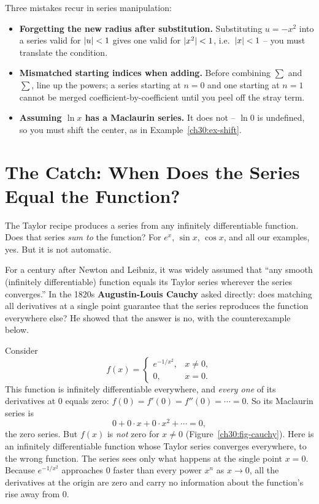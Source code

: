 \begin{trapbox}
Three mistakes recur in series manipulation:
\begin{itemize}
  \item \textbf{Forgetting the new radius after substitution.} Substituting $u=-x^2$ into a series valid for $\lvert u\rvert<1$ gives one valid for $\lvert x^2\rvert<1$, i.e.\ $\lvert x\rvert<1$ -- you must translate the condition.
  \item \textbf{Mismatched starting indices when adding.} Before combining $\sum$ and $\sum$, line up the powers; a series starting at $n=0$ and one starting at $n=1$ cannot be merged coefficient-by-coefficient until you peel off the stray term.
  \item \textbf{Assuming $\ln x$ has a Maclaurin series.} It does not -- $\ln 0$ is undefined, so you must shift the center, as in Example~\ref{ch30:ex-shift}.
\end{itemize}
\end{trapbox}

\section{The Catch: When Does the Series Equal the Function?}
\label{ch30:sec-catch}

The Taylor recipe produces a series from any infinitely differentiable function. Does that series \emph{sum to} the function? For $e^x$, $\sin x$, $\cos x$, and all our examples, yes. But it is not automatic.

For a century after Newton and Leibniz, it was widely assumed that ``any smooth (infinitely differentiable) function equals its Taylor series wherever the series converges.'' In the 1820s \textbf{Augustin-Louis Cauchy} asked directly: does matching all derivatives at a single point guarantee that the series reproduces the function everywhere else? He showed that the answer is no, with the counterexample below.

\begin{trapbox}
Consider
\[
  f(x) = \begin{cases} e^{-1/x^2}, & x \neq 0,\\[2pt] 0, & x = 0. \end{cases}
\]
This function is infinitely differentiable everywhere, and \emph{every one} of its derivatives at $0$ equals zero: $f(0) = f'(0) = f''(0) = \cdots = 0$. So its Maclaurin series is
\[
  0 + 0\cdot x + 0\cdot x^2 + \cdots = 0,
\]
the zero series. But $f(x)$ is \emph{not} zero for $x\neq 0$ (Figure~\ref{ch30:fig-cauchy}). Here is an infinitely differentiable function whose Taylor series converges everywhere, to the wrong function. The series sees only what happens at the single point $x=0$. Because $e^{-1/x^2}$ approaches $0$ faster than every power $x^n$ as $x \to 0$, all the derivatives at the origin are zero and carry no information about the function's rise away from $0$.
\end{trapbox}

